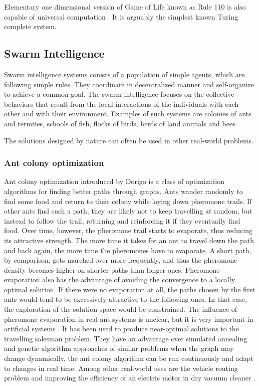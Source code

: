 Elementary one dimensional version of Game of Life known as Rule 110 is also capable of universal computation \cite{Cook04LifeOneDimensionalUniversal}. It is arguably the simplest known Turing complete system.


\subsection{Swarm Intelligence} %
\label{sub:swarm_intelligence}

Swarm intelligence  systems conists of a population of simple agents, which are following simple rules. They coordinate in decentralized manner and self-organize to achieve a common goal. The swarm intelligence focuses on the collective behaviors that result from the local interactions of the individuals with each other and with their environment. Examples of such systems are colonies of ants and termites, schools of fish, flocks of birds, herds of land animals and bees.

The solutions designed by nature can often be used in other real-world problems.

\subsubsection{Ant colony optimization} %
\label{ssub:ant_colony_optimization}

Ant colony optimization  introduced by Dorigo \cite{Dorigo96Ants} is a class of optimization algorithms for finding better paths through graphs. Ants wander randomly to find some food and return to their colony while laying down pheromone trails. If other ants find such a path, they are likely not to keep travelling at random, but instead to follow the trail, returning and reinforcing it if they eventually find food. Over time, however, the pheromone trail starts to evaporate, thus reducing its attractive strength. The more time it takes for an ant to travel down the path and back again, the more time the pheromones have to evaporate. A short path, by comparison, gets marched over more frequently, and thus the pheromone density becomes higher on shorter paths than longer ones. Pheromone evaporation also has the advantage of avoiding the convergence to a locally optimal solution. If there were no evaporation at all, the paths chosen by the first ants would tend to be excessively attractive to the following ones. In that case, the exploration of the solution space would be constrained. The influence of pheromone evaporation in real ant systems is unclear, but it is very important in artificial systems \cite{Dorigo04Ants}. It has been used to produce near-optimal solutions to the travelling salesman problem. They have an advantage over simulated annealing and genetic algorithm approaches of similar problems when the graph may change dynamically, the ant colony algorithm can be run continuously and adapt to changes in real time. Among other real-world uses are the vehicle routing problem \cite{Rizzoli07AntsVehicle} and improving the efficiency of an electric motor in dry vacuum cleaner \cite{Korosec09AntsVacuum}.

